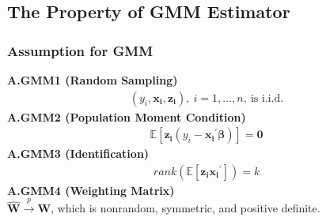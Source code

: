 \documentclass{article}
\begin{document}
\subsection{The Property of GMM Estimator}
\subsubsection{Assumption for GMM}
\textbf{A.GMM1 (Random Sampling)}
	\begin{align*}
		(y_i, \boldsymbol{x_i}, \boldsymbol{z_i}),\ i = 1, \ldots, n,\ \text{is i.i.d.}
	\end{align*}
\textbf{A.GMM2 (Population Moment Condition)}
	\begin{align*}
		\mathbb{E}[\boldsymbol{z_i}(y_i - \boldsymbol{x_i}^\prime \boldsymbol{\beta})] = \boldsymbol{0}
	\end{align*}
\textbf{A.GMM3 (Identification)}
	\begin{align*}
		rank(\mathbb{E}[\boldsymbol{z_i} \boldsymbol{x_i}^\prime]) = k
	\end{align*}
\textbf{A.GMM4 (Weighting Matrix)}\\
$\hat{\boldsymbol{W}} \xrightarrow{p} \boldsymbol{W}$, which is nonrandom, symmetric, and positive definite.
\end{document}
